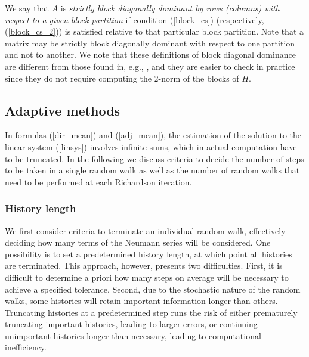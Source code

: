 \documentclass[times]{nlaauth}
\begin{document}
We say that $A$ is {\em strictly block diagonally dominant by rows (columns)
with respect to a given block partition}
if condition (\ref{block_cs}) (respectively, (\ref{block_cs_2})) is satisfied
relative to that particular block partition.
Note that a matrix may be strictly block diagonally dominant with
respect to one partition and not to another.
We note that these definitions of block diagonal dominance are different from
those found in, e.g., \cite{FV62}, and they are easier to check in practice
since they do not require computing the 2-norm of the blocks of $H$.

\subsection{Adaptive methods} \label{sec:adapt}

In formulas (\ref{dir_mean}) and (\ref{adj_mean}), the estimation of the
solution to
the linear system (\ref{linsys}) involves infinite sums, which in actual
computation have to be truncated. In the following we discuss criteria
to decide the number of steps to be taken in
a single random walk as well as the number of random walks that
need to be performed at each Richardson iteration.

\subsubsection{History length}

We first consider criteria to terminate an individual random walk, effectively
deciding how many terms of the Neumann series will be considered.
One possibility is to set a predetermined history length, at which point all
histories are terminated.  This approach, however, presents two difficulties.
First, it is difficult to determine a priori how many steps on average will be
necessary to achieve a specified tolerance.  Second, due to the stochastic
nature of the random walks, some histories will retain important information
longer than others.  Truncating histories at a predetermined step runs the
risk of either prematurely truncating important histories, leading to larger
errors, or continuing unimportant histories longer than necessary,
leading to computational inefficiency.
\end{document}
